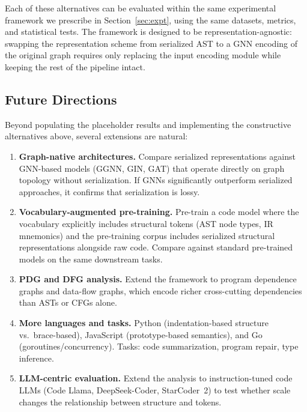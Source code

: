 \documentclass[pdflatex,sn-mathphys,Numbered]{sn-jnl}
\begin{document}
Each of these alternatives can be evaluated within the same experimental framework we prescribe in Section~\ref{sec:expt}, using the same datasets, metrics, and statistical tests. The framework is designed to be representation-agnostic: swapping the representation scheme from serialized AST to a GNN encoding of the original graph requires only replacing the input encoding module while keeping the rest of the pipeline intact.

\subsection{Future Directions}

Beyond populating the placeholder results and implementing the constructive alternatives above, several extensions are natural:

\begin{enumerate}
\item \textbf{Graph-native architectures.} Compare serialized representations against GNN-based models (GGNN, GIN, GAT) that operate directly on graph topology without serialization. If GNNs significantly outperform serialized approaches, it confirms that serialization is lossy.

\item \textbf{Vocabulary-augmented pre-training.} Pre-train a code model where the vocabulary explicitly includes structural tokens (AST node types, IR mnemonics) and the pre-training corpus includes serialized structural representations alongside raw code. Compare against standard pre-trained models on the same downstream tasks.

\item \textbf{PDG and DFG analysis.} Extend the framework to program dependence graphs and data-flow graphs, which encode richer cross-cutting dependencies than ASTs or CFGs alone.

\item \textbf{More languages and tasks.} Python (indentation-based structure vs.\ brace-based), JavaScript (prototype-based semantics), and Go (goroutines/concurrency). Tasks: code summarization, program repair, type inference.

\item \textbf{LLM-centric evaluation.} Extend the analysis to instruction-tuned code LLMs (Code Llama, DeepSeek-Coder, StarCoder~2) to test whether scale changes the relationship between structure and tokens.
\end{enumerate}
\end{document}

